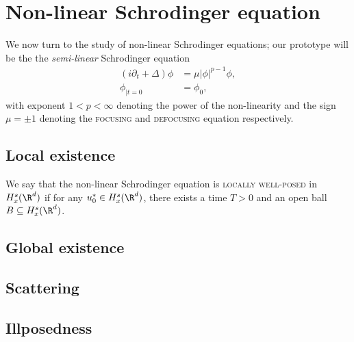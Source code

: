 \documentclass[reqno]{amsart}
\theoremstyle{definition}
\theoremstyle{remark}
\renewcommand{\emph}{\textsc}
\begin{document}
\section{Non-linear Schrodinger equation}

We now turn to the study of non-linear Schrodinger equations; our prototype will be the the \textit{semi-linear} Schrodinger equation 
\begin{align*}
	(i \partial_t + \Delta) \phi
		&= \mu |\phi|^{p - 1} \phi, \\
	\phi_{|t = 0}
		&= \phi_0,
\end{align*}
with exponent $1 < p < \infty$ denoting the power of the non-linearity and the sign $\mu = \pm 1$ denoting the \emph{focusing} and \emph{defocusing} equation respectively. 


\subsection{Local existence}

We say that the non-linear Schrodinger equation is \emph{locally well-posed} in $H^s_x (\R^d)$ if for any $u_0^* \in H^s_x (\R^d)$, there exists a time $T > 0$ and an open ball $B \subseteq H^s_x (\R^d)$. 



\subsection{Global existence}

\subsection{Scattering}

\subsection{Illposedness}


 
\end{document}
